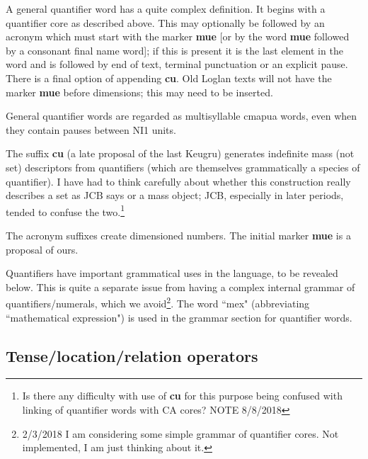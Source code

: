 \documentclass[12pt]{book}
\begin{document}
A general quantifier word has a quite complex definition.   It begins with a quantifier core as described above.  This may optionally be followed by an acronym which must start with the marker {\bf mue} [or by the word {\bf mue} followed by a consonant final name word]; if this is present it is the last element in the word and is followed by end of text, terminal punctuation or an explicit pause.  There is a final option of appending {\bf cu}.   Old Loglan texts will not have the marker {\bf mue} before dimensions;  this may need to be inserted.

General quantifier words are regarded as multisyllable cmapua words, even when they contain pauses between NI1 units.

The suffix {\bf cu} (a late proposal of the last Keugru) generates indefinite mass  (not set) descriptors from quantifiers
(which are themselves grammatically a species of quantifier).  I have had to think carefully about whether this construction really describes a set as JCB says or a mass object; JCB, especially in later periods, tended to confuse the two.\footnote{Is there any difficulty with use of {\bf cu} for this purpose being confused with linking of quantifier words with CA cores?  NOTE 8/8/2018}

The acronym suffixes create dimensioned numbers.   The initial marker {\bf mue} is a proposal of ours.

Quantifiers have important grammatical uses in the language, to be revealed below.   This is quite a separate issue from having a complex internal grammar of quantifiers/numerals, which we avoid\footnote{2/3/2018 I am considering some simple grammar of quantifier cores.  Not implemented, I am just thinking about it.}.   The word ``mex" (abbreviating ``mathematical expression") is used in the grammar section for quantifier words.

\subsection{Tense/location/relation operators}
\end{document}
